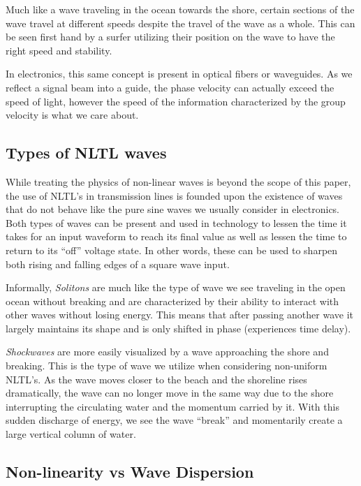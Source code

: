 \documentclass[journal]{IEEEtran} \usepackage[english]{babel}
\begin{document}
Much like a wave traveling in the ocean towards the shore, certain sections of
the wave travel at different speeds despite the travel of the wave as a whole.
This can be seen first hand by a surfer utilizing their position on the wave to
have the right speed and stability. 

In electronics, this same concept is present in optical fibers or waveguides. As
we reflect a signal beam into a guide, the phase velocity can actually exceed
the speed of light, however the speed of the information characterized by
the group velocity is what we care about. 



\subsection{Types of NLTL waves}\label{sub:NLTLTypes}
While treating the physics of non-linear waves is beyond the scope of this
paper, the use of NLTL's in transmission lines is founded upon the existence of
waves that do not behave like the pure sine waves we usually consider in
electronics. Both types of waves can be present and used in technology to
lessen the time it takes for an input waveform to reach its final value as well
as lessen the time to return to its ``off'' voltage state. In other words, these
can be used to sharpen both rising and falling edges of a square
wave input\cite{afshari2005nonlinear}.

Informally, \emph{Solitons} are much like the type of wave we see
traveling in the open ocean without breaking and are characterized by their
ability to interact with other waves without losing energy. This means that
after passing another wave it largely maintains its shape and is only shifted in
phase (experiences time delay).


\emph{Shockwaves} are more easily visualized by a wave approaching the shore and
breaking. This is the type of wave we utilize when considering non-uniform
NLTL's. As the wave moves closer to the beach and the shoreline rises
dramatically, the wave can no longer move in the same way due to the shore
interrupting the circulating water and the momentum carried by it. With this
sudden discharge of energy, we see the wave ``break'' and momentarily create a
large vertical column of water. 


\subsection{Non-linearity vs Wave Dispersion}\label{NonlinearVsDispersion}
\end{document}
